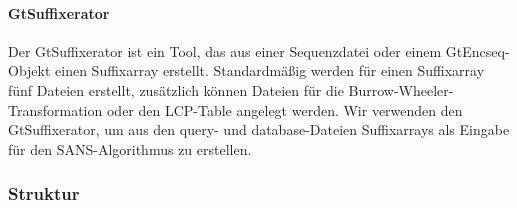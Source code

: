 \documentclass{article}
\begin{document}
\paragraph{GtSuffixerator}
Der GtSuffixerator ist ein Tool, das aus einer Sequenzdatei oder einem GtEncseq-Objekt einen Suffixarray erstellt. Standardmäßig werden für einen Suffixarray fünf Dateien erstellt, zusätzlich können Dateien für die Burrow-Wheeler-Transformation oder den LCP-Table angelegt werden. Wir verwenden den GtSuffixerator, um aus den query- und database-Dateien Suffixarrays als Eingabe für den SANS-Algorithmus zu erstellen.

\subsubsection{Struktur}
\end{document}
